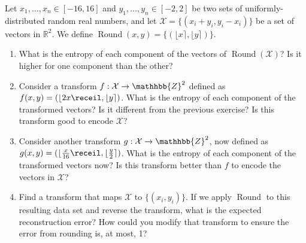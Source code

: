 \begin{exercise}
Let $x_1, \ldots , x_n \in [-16,16]$ and $y_1, \ldots , y_n \in [-2,2]$ be two sets of uniformly-distributed random real numbers, and let $\mathcal{X}=\lbrace (x_i + y_i, y_i - x_i) \rbrace$ be a set of vectors in $\mathbb{R}^2$. We define $\operatorname{Round}(x,y) = \lbrace (\lfloor x \rceil, \lfloor y \rceil ) \rbrace$.
\begin{enumerate}
\item What is the entropy of each component of the vectors of $\operatorname{Round}(\mathcal{X})$? Is it higher for one component than the other?
\item Consider a transform $f : \mathcal{X} \rightarrow \mathhbb{Z}^2$ defined as $f(x,y) = (\lfloor 2x \receil, \lfloor y \rceil)$. What is the entropy of each component of the transformed vectors? Is it different from the previous exercise? Is this transform good to encode $\mathcal{X}$?
\item Consider another transform $g : \mathcal{X} \rightarrow \mathhbb{Z}^2$, now defined as $g(x,y) = (\lfloor \frac{x}{16} \receil, \lfloor \frac{y}{2} \rceil)$. What is the entropy of each component of the transformed vectors now? Is this transform better than $f$ to encode the vectors in $\mathcal{X}$?
\item Find a transform that maps $\mathcal{X}$ to $\lbrace (x_i,y_i) \rbrace$. If we apply $\operatorname{Round}$ to this resulting data set and reverse the transform, what is the expected reconstruction error? How could you modify that transform to ensure the error from rounding is, at most, 1?
\end{enumerate}
\end{exercise}

\vspace{0.25cm}

